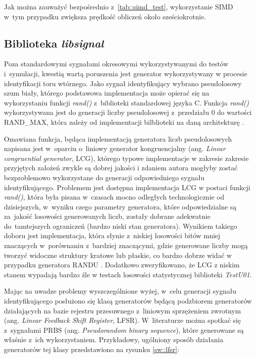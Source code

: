 Jak można zauważyć bezpośrednio z~\ref{tab::simd_test}, wykorzystanie SIMD w~tym
przypadku zwiększa prędkość obliczeń około sześciokrotnie.

\subsection{Biblioteka \textit{libsignal}}

Poza standardowymi sygnałami okresowymi wykorzystywanymi do testów i~symulacji,
kwestią wartą poruszenia jest generator wykorzystywany w procesie identyfikacji
toru wtórnego. Jako sygnał identyfikujący wybrano pseudolosowy szum biały,
którego podstawowa implementacja może opierać się na wykorzystaniu funkcji
\textit{rand()} z~biblioteki standardowej języka C. Funkcja \textit{rand()}
wykorzystywana jest do generacji liczby pseudolosowej z~przedziału 0 do wartości
RAND\_MAX, która zależy od implementacji bilblioteki na daną architekturę
\cite{bib:cpp}. \par Omawiana funkcja, będąca implementacją generatora liczb
pseudolosowych napisana jest w~oparciu o~liniowy generator kongruencjalny (ang.
\textit{Linear congruential generator}, LCG), którego typowe implementacje w
zakresie zakresie przyjętych założeń zwykle są dobrej jakości i zdaniem autora
mogłyby zostać bezproblemowo wykorzystane do generacji odpowiedniego sygnału
identyfikującego. Problemem jest dostępna implementacja LCG w postaci funkcji
\textit{rand()}, która była pisana w~czasach mocno odległych technologicznie od
dzisiejszych, w~wyniku czego parametry generatora, które odpowiedzialne są
za~jakość losowości generowanych liczb, zostały dobrane adekwatnie
do~tamtejszych ograniczeń (bardzo niski stan generatora). Wynikiem takiego
doboru jest implementacja, która słynie z~niskiej losowości bitów mniej
znaczących w~porównaniu z~bardziej znaczącymi, gdzie generowane liczby mogą
tworzyć widoczne struktury kratowe lub płaskie, co bardzo dobrze widać w
przypadku generatora RANDU \cite{bib:rand}. Dodatkowo zweryfikowano, że LCG z
niskim stanem wypadają bardzo źle w testach losowości statystycznej biblioteki
\textit{TestU01}. \par Mając na uwadze problemy wyszczególnione wyżej, w~celu
generacji sygnału identyfikującego posłużono się klasą generatorów będącą
podzbiorem generatorów działających na bazie rejestru przesuwnego z~liniowym
sprzężeniem zwrotnym (ang. \textit{Linear Feedback Shift Register}, LFSR).
W~literaturze \cite{bib:kuo_morgan} \cite{bib:figwer} można spotkać się
z~sygnałami PRBS (ang. \textit{Pseudorandom binary sequence}), które generowane
są właśnie z~ich wykorzystaniem. Przykładowy, ugólniony sposób działania
generatorów tej klasy przedstawiono na rysunku \ref{sw::lfsr}:

